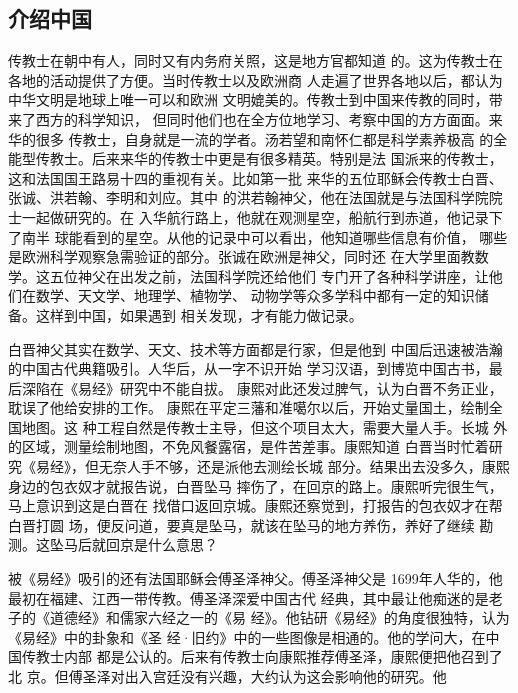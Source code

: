 \subsection{介绍中国}
\par
传教士在朝中有人，同时又有内务府关照，这是地方官都知道%
的。这为传教士在各地的活动提供了方便。当时传教士以及欧洲商%
人走遍了世界各地以后，都认为中华文明是地球上唯一可以和欧洲%
文明媲美的。传教士到中国来传教的同时，带来了西方的科学知识，%
但同时他们也在全方位地学习、考察中国的方方面面。来华的很多%
传教士，自身就是一流的学者。汤若望和南怀仁都是科学素养极高%
的全能型传教士。后来来华的传教士中更是有很多精英。特别是法%
国派来的传教士，这和法国国王路易十四的重视有关。比如第一批%
来华的五位耶稣会传教士白晋、张诚、洪若翰、李明和刘应。其中%
的洪若翰神父，他在法国就是与法国科学院院士一起做研究的。在%
入华航行路上，他就在观测星空，船航行到赤道，他记录下了南半%
球能看到的星空。从他的记录中可以看出，他知道哪些信息有价值，%
哪些是欧洲科学观察急需验证的部分。张诚在欧洲是神父，同时还%
在大学里面教数学。这五位神父在出发之前，法国科学院还给他们%
专门开了各种科学讲座，让他们在数学、天文学、地理学、植物学、%
动物学等众多学科中都有一定的知识储备。这样到中国，如果遇到%
相关发现，才有能力做记录。%
\par
白晋神父其实在数学、天文、技术等方面都是行家，但是他到%
中国后迅速被浩瀚的中国古代典籍吸引。人华后，从一字不识开始%
学习汉语，到博览中国古书，最后深陷在《易经》研究中不能自拔。%
康熙对此还发过脾气，认为白晋不务正业，耽误了他给安排的工作。%
康熙在平定三藩和准噶尔以后，开始丈量国土，绘制全国地图。这%
种工程自然是传教士主导，但这个项目太大，需要大量人手。长城%
外的区域，测量绘制地图，不免风餐露宿，是件苦差事。康熙知道%
白晋当时忙着研究《易经》，但无奈人手不够，还是派他去测绘长城%
部分。结果出去没多久，康熙身边的包衣奴才就报告说，白晋坠马%
摔伤了，在回京的路上。康熙听完很生气，马上意识到这是白晋在%
找借口返回京城。康熙还察觉到，打报告的包衣奴才在帮白晋打圆%
场，便反问道，要真是坠马，就该在坠马的地方养伤，养好了继续%
勘测。这坠马后就回京是什么意思？%
\par
被《易经》吸引的还有法国耶稣会傅圣泽神父。傅圣泽神父是%
1699年人华的，他最初在福建、江西一带传教。傅圣泽深爱中国古代%
经典，其中最让他痴迷的是老子的《道德经》和儒家六经之一的《易%
经》。他钻研《易经》的角度很独特，认为《易经》中的卦象和《圣%
经·旧约》中的一些图像是相通的。他的学问大，在中国传教士内部%
都是公认的。后来有传教士向康熙推荐傅圣泽，康熙便把他召到了北%
京。但傅圣泽对出入宫廷没有兴趣，大约认为这会影响他的研究。他%
